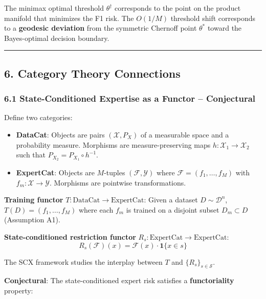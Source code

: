 \documentclass[
  12pt,
]{ctexart}
\begin{document}
The minimax optimal threshold \(\theta^\dagger\) corresponds to the
point on the product manifold that minimizes the F1 risk. The \(O(1/M)\)
threshold shift corresponds to a \textbf{geodesic deviation} from the
symmetric Chernoff point \(\theta^*\) toward the Bayes-optimal decision
boundary.

\begin{center}\rule{0.5\linewidth}{0.5pt}\end{center}

\subsection{6. Category Theory
Connections}\label{category-theory-connections}

\subsubsection{6.1 State-Conditioned Expertise as a Functor --
Conjectural}\label{state-conditioned-expertise-as-a-functor-conjectural}

Define two categories:

\begin{itemize}
\item
  \textbf{DataCat}: Objects are pairs \((\mathcal{X}, P_X)\) of a
  measurable space and a probability measure. Morphisms are
  measure-preserving maps \(h: \mathcal{X}_1 \to \mathcal{X}_2\) such
  that \(P_{X_2} = P_{X_1} \circ h^{-1}\).
\item
  \textbf{ExpertCat}: Objects are \(M\)-tuples
  \((\mathcal{F}, \mathcal{Y})\) where
  \(\mathcal{F} = (f_1, \dots, f_M)\) with
  \(f_m: \mathcal{X} \to \mathcal{Y}\). Morphisms are pointwise
  transformations.
\end{itemize}

\textbf{Training functor} \(T: \text{DataCat} \to \text{ExpertCat}\):
Given a dataset \(D \sim \mathcal{D}^n\), \(T(D) = (f_1, \dots, f_M)\)
where each \(f_m\) is trained on a disjoint subset \(D_m \subset D\)
(Assumption A1).

\textbf{State-conditioned restriction functor}
\(R_s: \text{ExpertCat} \to \text{ExpertCat}\):
\[R_s(\mathcal{F})(x) = \mathcal{F}(x) \cdot \mathbf{1}\{x \in s\}\]

The SCX framework studies the interplay between \(T\) and
\(\{R_s\}_{s \in \mathcal{S}}\).

\textbf{Conjectural}: The state-conditioned expert risk satisfies a
\textbf{functoriality} property:
\end{document}
